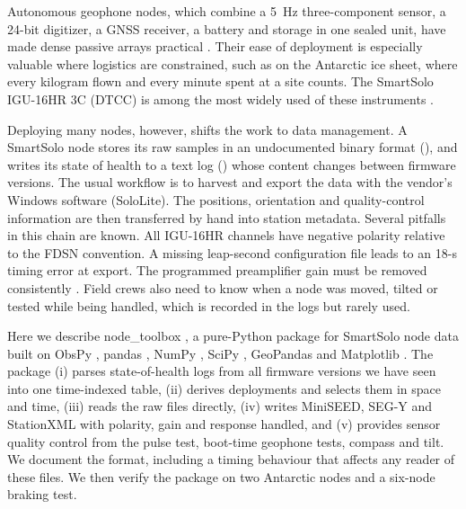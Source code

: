 \documentclass[report]{seismica}
\begin{document}
Autonomous geophone nodes, which combine a 5~Hz three-component sensor, a 24-bit digitizer, a GNSS receiver, a battery and storage in one sealed unit, have made dense passive arrays practical \citep{karplus_preface_2018,ringler_nodes_2018}. Their ease of deployment is especially valuable where logistics are constrained, such as on the Antarctic ice sheet, where every kilogram flown and every minute spent at a site counts. The SmartSolo IGU-16HR 3C (DTCC) is among the most widely used of these instruments \citep{zeckra_smartsolo_2022}.

Deploying many nodes, however, shifts the work to data management. A SmartSolo node stores its raw samples in an undocumented binary format (), and writes its state of health to a text log () whose content changes between firmware versions. The usual workflow is to harvest and export the data with the vendor's Windows software (SoloLite). The positions, orientation and quality-control information are then transferred by hand into station metadata. Several pitfalls in this chain are known. All IGU-16HR channels have negative polarity relative to the FDSN convention. A missing leap-second configuration file leads to an 18-s timing error at export. The programmed preamplifier gain must be removed consistently \citep{auspass_nodes,auspass_data}. Field crews also need to know when a node was moved, tilted or tested while being handled, which is recorded in the logs but rarely used.

Here we describe node\_toolbox \citep{node_toolbox}, a pure-Python package for SmartSolo node data built on ObsPy \citep{beyreuther_obspy_2010,krischer_obspy_2015}, pandas \citep{mckinney_pandas_2010}, NumPy \citep{harris_numpy_2020}, SciPy \citep{virtanen_scipy_2020}, GeoPandas \citep{jordahl_geopandas_2020} and Matplotlib \citep{hunter_matplotlib_2007}. The package (i) parses state-of-health logs from all firmware versions we have seen into one time-indexed table, (ii) derives deployments and selects them in space and time, (iii) reads the raw  files directly, (iv) writes MiniSEED, SEG-Y \citep{seg_segy_2017} and StationXML \citep{fdsn_stationxml} with polarity, gain and response handled, and (v) provides sensor quality control from the pulse test, boot-time geophone tests, compass and tilt. We document the  format, including a timing behaviour that affects any reader of these files. We then verify the package on two Antarctic nodes and a six-node braking test.

\end{document}

